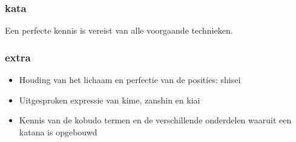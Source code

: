 \documentclass[12pt]{scrartcl}
\begin{document}
\begin{CJK*}{UTF8}{min}
\subsubsection{kata}
\noindent Een perfecte kennis is vereist van alle voorgaande technieken.\\

\subsubsection{extra}
\begin{itemize}
\item Houding van het lichaam en perfectie van de posities: shisei
\item Uitgesproken expressie van kime, zanshin en kiai
\item Kennis van de kobudo termen en de verschillende onderdelen waaruit een katana is opgebouwd
\end{itemize}

\end{CJK*}
\end{document}
